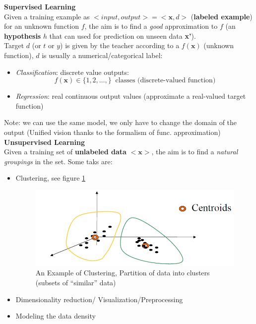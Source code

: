 \documentclass[../main.tex]{subfiles}
\begin{document}
\noindent\textbf{Supervised Learning}\\
Given a training example as $<input,output>=<\textbf{x},d>$ (\textbf{labeled example}) for an unknown function $f$, the aim is to find a \emph{good} approximation to $f$ (an \textbf{hypothesis} $h$ that can used for prediction on unseen data \textbf{x'}).\\
Target $d$ (or $t$ or $y$) is given by the teacher according to a $f(\mathbf{x})$ (unknown function), $d$ is usually a numerical/categorical label:
\begin{itemize}
    \item \textit{Classification}: discrete value outputs: 
    $$ f(\mathbf{x}) \in \{1, 2, \dots, \} \; \; \text{classes (discrete-valued function)}$$ 
    \item \textit{Regression}: real continuous output values (approximate a real-valued
target function)
\end{itemize}
Note: we can use the same model, we only have to change the domain of the output (Unified vision thanks to the formalism of func. approximation)\\
\newline
\textbf{Unsupervised Learning}\\
Given a training set of \textbf{unlabeled data} $<\textbf{x}>$, the aim is to find a \emph{natural groupings} in the set.
Some taks are:
\begin{itemize}
    \item Clustering, see figure \ref{fig:intro_clusterinng_exp}
    \begin{figure}
        \centering
        \includegraphics[scale=0.5]{lectures/1_Introduction/clustering.png}
        \caption{An Example of Clustering, Partition of data into clusters (subsets of “similar” data)}
        \label{fig:intro_clusterinng_exp}
    \end{figure}
    \item Dimensionality reduction/ Visualization/Preprocessing
    \item Modeling the data density
\end{itemize}
\end{document}
